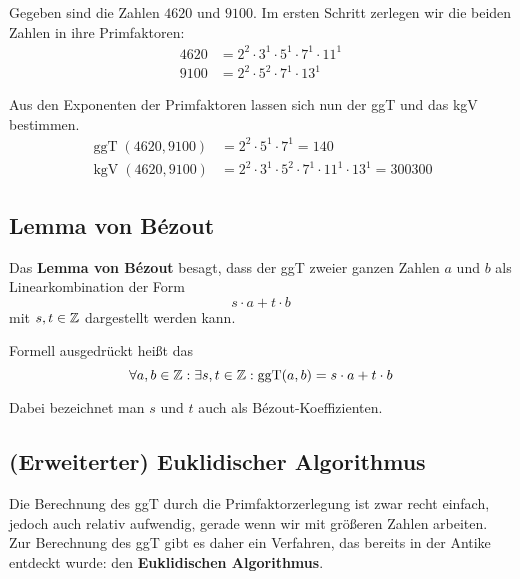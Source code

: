 \documentclass[11pt]{article}
\begin{document}
\begin{bsp}
  Gegeben sind die Zahlen $4620$ und $9100$. Im ersten Schritt zerlegen wir die beiden Zahlen in ihre Primfaktoren:
  \begin{align*}
    4620 & = 2^2 \cdot 3^1 \cdot 5^1 \cdot 7^1 \cdot 11^1 \\
    9100 & = 2^2 \cdot 5^2 \cdot 7^1 \cdot 13^1
  \end{align*}

  Aus den Exponenten der Primfaktoren lassen sich nun der ggT und das kgV bestimmen.
  \begin{align*}
    \operatorname{ggT}(4620, 9100) & = 2^2 \cdot 5^1 \cdot 7^1 = 140                                    \\
    \operatorname{kgV}(4620, 9100) & = 2^2 \cdot 3^1 \cdot 5^2 \cdot 7^1 \cdot 11^1 \cdot 13^1 = 300300
  \end{align*}
\end{bsp}

\subsection{Lemma von Bézout}
Das \textbf{Lemma von Bézout} besagt, dass der ggT zweier ganzen Zahlen $a$ und $b$ als Linearkombination der Form
\[
  s \cdot a + t \cdot b
\]
mit $s, t \in \mathbb{Z}$ dargestellt werden kann.

Formell ausgedrückt heißt das
\[
  \forall a,b \in \mathbb{Z}: \exists s,t \in \mathbb{Z}: \operatorname{ggT}(a,b) = s \cdot a + t \cdot b
\]

Dabei bezeichnet man $s$ und $t$ auch als Bézout-Koeffizienten.

\subsection{(Erweiterter) Euklidischer Algorithmus}
Die Berechnung des ggT durch die Primfaktorzerlegung ist zwar recht einfach, jedoch auch relativ aufwendig, gerade wenn
wir mit größeren Zahlen arbeiten. Zur Berechnung des ggT gibt es daher ein Verfahren, das bereits in der Antike entdeckt
wurde: den \textbf{Euklidischen Algorithmus}.
\end{document}
